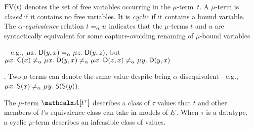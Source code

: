 $\mathrm{FV}( t )$ denotes the set of free variables occurring in the $\mu$-term~$t$.
A $\mu$-term is \emph{closed} if %
it contains no free variables. It is \emph{cyclic} if %
it contains a bound variable. The $\alpha$\emph{-equiv\-alence} relation $t \mathrel{=_\alpha} u$
indicates that the $\mu$-terms $t$ and $u$
are syntactically equivalent for some capture-avoiding renaming of $\mu$-bound variables\begin{rep}---e.g.,
$\MU x.\; \const{D}( y, x ) \aequiv \MU z.\; \const{D}( y, z )$,
but
$\MU x.\; \const{C}( x ) \not\aequiv \MU x.\; \const{D}( y, x ) \not\aequiv \MU x.\; \const{D}( z, x )
\not\aequiv \MU y.\; \const{D}( y, x )$\end{rep}.
Two $\mu$-terms can denote the same value despite being $\alpha$-disequivalent---e.g.,
$\MU x.\; \const{S}( x ) \not\aequiv \MU y.\; \const{S}( \const{S}( y ) )$.


%
%
%

The $\mu$-term $\Val[t\typ{\tau}]$ describes a class of $\tau$ values
that $t$ and other members of $t$'s equivalence class can take in models of $E$.
When $\tau$ is a datatype, %
a cyclic $\mu$-term describes an infeasible class of values.

